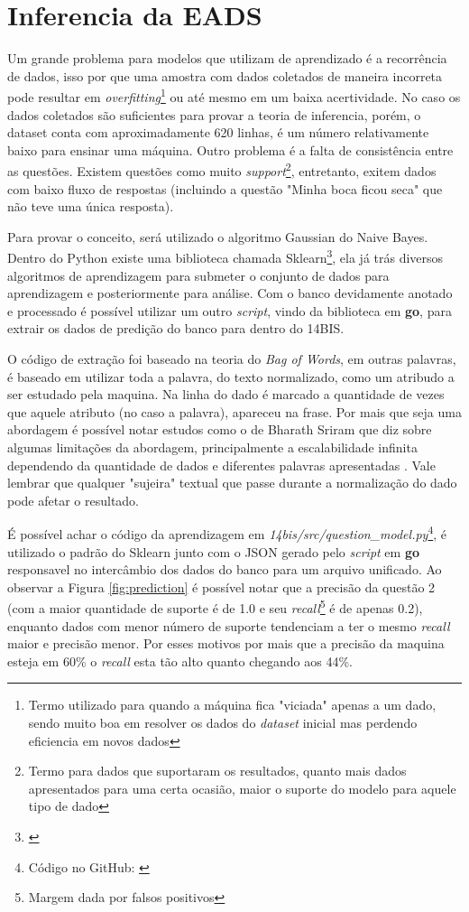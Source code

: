 \section{Inferencia da EADS}
Um grande problema para modelos que utilizam de aprendizado é a recorrência de dados, isso por que uma amostra com dados coletados de maneira incorreta pode resultar em \textit{overfitting}\footnote{Termo utilizado para quando a máquina fica "viciada" apenas a um dado, sendo muito boa em resolver os dados do \textit{dataset} inicial mas perdendo eficiencia em novos dados} ou até mesmo em um baixa acertividade. No caso os dados coletados são suficientes para provar a teoria de inferencia, porém, o dataset conta com aproximadamente 620 linhas, é um número relativamente baixo para ensinar uma máquina. Outro problema é a falta de consistência entre as questões. Existem questões como muito \textit{support}\footnote{Termo para dados que suportaram os resultados, quanto mais dados apresentados para uma certa ocasião, maior o suporte do modelo para aquele tipo de dado}, entretanto, exitem dados com baixo fluxo de respostas (incluindo a questão "Minha boca ficou seca" que não teve uma única resposta).

Para provar o conceito, será utilizado o algoritmo Gaussian do Naive Bayes\cite{john1995estimating}. Dentro do Python existe uma biblioteca chamada Sklearn\footnote{\url{}}, ela já trás diversos algoritmos de aprendizagem para submeter o conjunto de dados para aprendizagem e posteriormente para análise. Com o banco devidamente anotado e processado é possível utilizar um outro \textit{script}, vindo da biblioteca em \textbf{go}, para extrair os dados de predição do banco para dentro do 14BIS.

O código de extração foi baseado na teoria do \textit{Bag of Words}\cite{zhang2010understanding}, em outras palavras, é baseado em utilizar toda a palavra, do texto normalizado, como um atribudo a ser estudado pela maquina. Na linha do dado é marcado a quantidade de vezes que aquele atributo (no caso a palavra), apareceu na frase. Por mais que seja uma abordagem é possível notar estudos como o de Bharath Sriram que diz sobre algumas limitações da abordagem, principalmente a escalabilidade infinita dependendo da quantidade de dados e diferentes palavras apresentadas \cite{sriram2010short}. Vale lembrar que qualquer "sujeira" textual que passe durante a normalização do dado pode afetar o resultado.

É possível achar o código da aprendizagem em \textit{14bis/src/question\_model.py}\footnote{Código no GitHub: \url{}}, é utilizado o padrão do Sklearn junto com o JSON gerado pelo \textit{script} em \textbf{go} responsavel no intercâmbio dos dados do banco para um arquivo unificado. Ao observar a Figura \ref{fig:prediction} é possível notar que a precisão da questão 2 (com a maior quantidade de suporte é de 1.0 e seu \textit{recall}\footnote{Margem dada por falsos positivos} é de apenas 0.2), enquanto dados com menor número de suporte tendenciam a ter o mesmo \textit{recall} maior e precisão menor. Por esses motivos por mais que a precisão da maquina esteja em 60\% o \textit{recall} esta tão alto quanto chegando aos 44\%.

